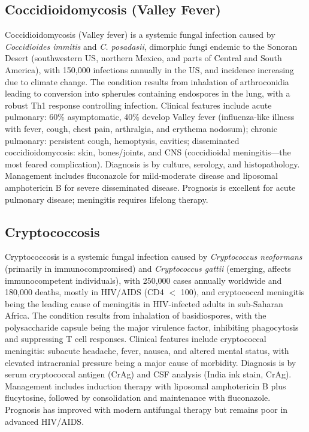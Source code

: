 \subsection{Coccidioidomycosis (Valley Fever)}
\label{sec:Coccidioidomycosis}
Coccidioidomycosis (Valley fever) is a systemic fungal infection caused by \textit{Coccidioides immitis} and \textit{C. posadasii}, dimorphic fungi endemic to the Sonoran Desert (southwestern US, northern Mexico, and parts of Central and South America), with 150,000 infections annually in the US, and incidence increasing due to climate change. The condition results from inhalation of arthroconidia leading to conversion into spherules containing endospores in the lung, with a robust Th1 response controlling infection. Clinical features include acute pulmonary: 60\% asymptomatic, 40\% develop Valley fever (influenza-like illness with fever, cough, chest pain, arthralgia, and erythema nodosum); chronic pulmonary: persistent cough, hemoptysis, cavities; disseminated coccidioidomycosis: skin, bones/joints, and CNS (coccidioidal meningitis---the most feared complication). Diagnosis is by culture, serology, and histopathology. Management includes fluconazole for mild-moderate disease and liposomal amphotericin B for severe disseminated disease. Prognosis is excellent for acute pulmonary disease; meningitis requires lifelong therapy.

\subsection{Cryptococcosis}
\label{sec:Cryptococcosis}
Cryptococcosis is a systemic fungal infection caused by \textit{Cryptococcus neoformans} (primarily in immunocompromised) and \textit{Cryptococcus gattii} (emerging, affects immunocompetent individuals), with 250,000 cases annually worldwide and 180,000 deaths, mostly in HIV/AIDS (CD4 $<$ 100), and cryptococcal meningitis being the leading cause of meningitis in HIV-infected adults in sub-Saharan Africa. The condition results from inhalation of basidiospores, with the polysaccharide capsule being the major virulence factor, inhibiting phagocytosis and suppressing T cell responses. Clinical features include cryptococcal meningitis: subacute headache, fever, nausea, and altered mental status, with elevated intracranial pressure being a major cause of morbidity. Diagnosis is by serum cryptococcal antigen (CrAg) and CSF analysis (India ink stain, CrAg). Management includes induction therapy with liposomal amphotericin B plus flucytosine, followed by consolidation and maintenance with fluconazole. Prognosis has improved with modern antifungal therapy but remains poor in advanced HIV/AIDS.

